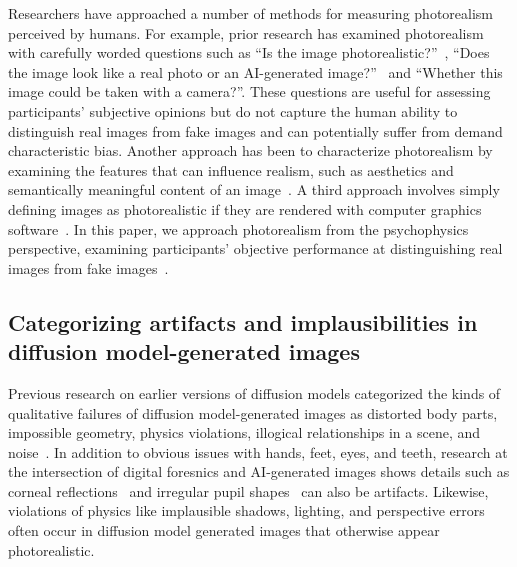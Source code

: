 Researchers have approached a number of methods for measuring photorealism perceived by humans. For example, prior research has examined photorealism with carefully worded questions such as ``Is the image photorealistic?''~\cite{liang2024rich}, ``Does the image look like a real photo or an AI-generated image?''~\cite{lee2024holistic, otani2023toward} and ``Whether this image could be taken with a camera?''\cite{yan2024sanitycheckaigeneratedimage}. These questions are useful for assessing participants' subjective opinions but do not capture the human ability to distinguish real images from fake images and can potentially suffer from demand characteristic bias. Another approach has been to characterize photorealism by examining the features that can influence realism, such as aesthetics and semantically meaningful content of an image~\cite{peng2024crafting}. A third approach involves simply defining images as photorealistic if they are rendered with computer graphics software~\cite{lyu2005realistic}. In this paper, we approach photorealism from the psychophysics perspective, examining participants' objective performance at distinguishing real images from fake images~\cite{zhou2019hype}. 

\subsection{Categorizing artifacts and implausibilities in diffusion model-generated images} \label{sec:artifimpl}

Previous research on earlier versions of diffusion models categorized the kinds of qualitative failures of diffusion model-generated images as distorted body parts, impossible geometry, physics violations, illogical relationships in a scene, and noise~\cite{borji2023qualitative}. In addition to obvious issues with hands, feet, eyes, and teeth, research at the intersection of digital foresnics and AI-generated images shows details such as corneal reflections~\cite{hu2021exposing} and irregular pupil shapes~\cite{guo2022eyes} can also be artifacts.  Likewise, violations of physics like implausible shadows, lighting, and perspective errors~\cite{farid2022perspectiveinconsistencypainttext, farid2022lighting, sarkar2024shadows} often occur in diffusion model generated images that otherwise appear photorealistic. 